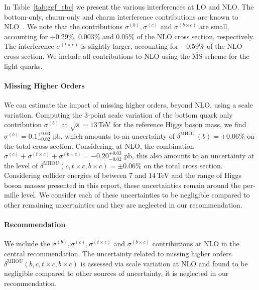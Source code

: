 In Table~\ref{tab:ggf_tbc} we present the various interferences at LO and NLO.
The bottom-only, charm-only and charm interference contributions are known to NLO~\cite{Graudenz:1992pv,Spira:1995rr}.
We note that the contributions $\sigma^{(b)}, \sigma^{(c)}$ and $\sigma^{(b \times c)}$ are small, accounting for $+0.29\%$, $0.003\%$ and $0.05\%$ of the NLO cross section, respectively.
The interference $\sigma^{(t \times c)}$ is slightly larger, accounting for $-0.59\%$ of the NLO cross section.
We include all contributions to NLO using the $\overline{\mathrm{MS}}$ scheme for the light quarks.

\paragraph{Missing Higher Orders}
We can estimate the impact of missing higher orders, beyond NLO, using a scale variation.
Computing the 3-point scale variation of the bottom quark only contribution $\sigma^{(b)}$ at $\sqrt{s}= 13$\,TeV for the reference Higgs boson mass, we find  $\sigma^{(b)} = 0.1^{+0.03}_{-0.02}$ pb, which amounts to an uncertainty of $\delta^{\mathrm{MHOU}}(b)=\pm 0.06\%$ on the total cross section.
Considering, at NLO, the combination $\sigma^{(c)}+\sigma^{(t \times c)} + \sigma^{(b \times c)}= -0.20^{+0.03}_{-0.02}$ pb, this also amounts to an uncertainty at the level of $\delta^{\mathrm{MHOU}}(c,t \times c, b \times c)=\pm 0.06\%$ on the total cross section.
Considering collider energies of between $7$ and $14$\,TeV and the range of Higgs boson masses presented in this report, these uncertainties remain around the per-mille level.
We consider each of these uncertainties to be negligible compared to other remaining uncertainties and they are neglected in our recommendation.
 
\paragraph{Recommendation}
We include the $\sigma^{(b)},\sigma^{(c)},\sigma^{(t \times c)}$ and $\sigma^{(b \times c)}$ contributions at NLO in the central recommendation.
The uncertainty related to missing higher orders $\delta^{\mathrm{MHOU}}(b,c,t\times c,b \times c)$ is assessed via scale variation at NLO and found to be negligible compared to other sources of uncertainty, it is neglected in our recommendation.


